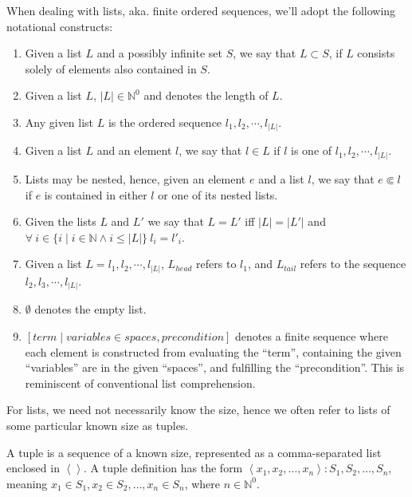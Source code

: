 \begin{definition} When dealing with lists, aka. finite ordered sequences,
we'll adopt the following notational constructs:

\begin{enumerate}

\item Given a list $L$ and a possibly infinite set $S$, we say that $L\subset
S$, if $L$ consists solely of elements also contained in $S$.

\item Given a list $L$, $|L|\in\mathbb{N}^0$ and denotes the length of $L$.

\item Any given list $L$ is the ordered sequence $l_1,l_2,\cdots,l_{|L|}$.

\item Given a list $L$ and an element $l$, we say that $l\in L$ if $l$ is one
of $l_1,l_2,\cdots,l_{|L|}$.

\item Lists may be nested, hence, given an element $e$ and a list $l$, we say
that $e\Subset l$ if $e$ is contained in either $l$ or one of its nested lists.

\item Given the lists $L$ and $L'$ we say that $L=L'$ iff $|L|=|L'|$ and
$\forall\ i\in \{i\mid i\in\mathbb{N} \wedge i \leq |L|\}\ l_i=l'_i$.

\item Given a list $L=l_1,l_2,\cdots,l_{|L|}$, $L_{head}$ refers to $l_1$, and
$L_{tail}$ refers to the sequence $l_2,l_3,\cdots,l_{|L|}$.

\item $\emptyset$ denotes the empty list.

\item $\left[ term \mid variables \in spaces, precondition \right]$ denotes a
finite sequence where each element is constructed from evaluating the ``term'',
containing the given ``variables'' are in the given ``spaces'', and fulfilling
the ``precondition''. This is reminiscent of conventional list comprehension.

\end{enumerate}

\end{definition}

For lists, we need not necessarily know the size, hence we often refer to lists
of some particular known size as tuples.

\begin{definition} A tuple is a sequence of a known size, represented as a
comma-separated list enclosed in $\left\langle \right\rangle$. A tuple
definition has the form $\left\langle x_1,x_2,\ldots,x_n \right\rangle : S_1,
S_2, \ldots, S_n$, meaning $x_1\in S_1, x_2\in S_2, \ldots, x_n\in S_n$, where
$n\in\mathbb{N}^0$.\end{definition}

